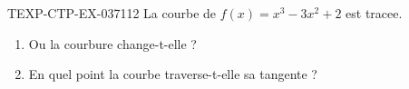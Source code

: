 \begin{exercice}{TEXP-CTP-EX-037}{1}{12}
La courbe de $f(x) = x^3 - 3x^2 + 2$ est tracee.
\begin{enumerate}
  \item Ou la courbure change-t-elle ?
  \item En quel point la courbe traverse-t-elle sa tangente ?
\end{enumerate}

\end{exercice}
